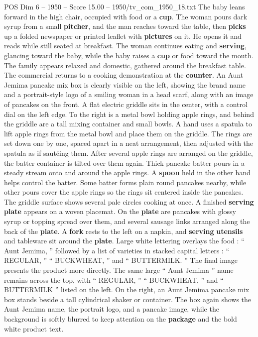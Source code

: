 \begin{textsample}{POS Dim 6 – 1950 – Score 15.00 – 1950/tv\_com\_1950\_18.txt}
The baby leans forward in the high chair, occupied with food or a \textbf{cup}.
The woman pours dark syrup from a small \textbf{pitcher}, and the man reaches toward the table, then \textbf{picks} up a folded newspaper or printed leaflet with \textbf{pictures} on it.
He opens it and reads while still seated at breakfast.
The woman continues eating and \textbf{serving}, glancing toward the baby, while the baby raises a \textbf{cup} or food toward the mouth.
The family appears relaxed and domestic, gathered around the breakfast table.
The commercial returns to a cooking demonstration at the \textbf{counter}.
An Aunt Jemima pancake mix box is clearly visible on the left, showing the brand name and a portrait-style logo of a smiling woman in a head scarf, along with an image of pancakes on the front.
A flat electric griddle sits in the center, with a control dial on the left edge.
To the right is a metal bowl holding apple rings, and behind the griddle are a tall mixing container and small bowls.
A hand uses a spatula to lift apple rings from the metal bowl and place them on the griddle.
The rings are set down one by one, spaced apart in a neat arrangement, then adjusted with the spatula as if sautéing them.
After several apple rings are arranged on the griddle, the batter container is tilted over them again.
Thick pancake batter pours in a steady stream onto and around the apple rings.
A \textbf{spoon} held in the other hand helps control the batter.
Some batter forms plain round pancakes nearby, while other pours cover the apple rings so the rings sit centered inside the pancakes.
The griddle surface shows several pale circles cooking at once.
A finished \textbf{serving} \textbf{plate} appears on a woven placemat.
On the \textbf{plate} are pancakes with glossy syrup or topping spread over them, and several sausage links arranged along the back of the \textbf{plate}.
A \textbf{fork} rests to the left on a napkin, and \textbf{serving} \textbf{utensils} and tableware sit around the \textbf{plate}.
Large white lettering overlays the food : “ Aunt Jemima, ” followed by a list of varieties in stacked capital letters : “ REGULAR, ” “ BUCKWHEAT, ” and “ BUTTERMILK. ” The final image presents the product more directly.
The same large “ Aunt Jemima ” name remains across the top, with “ REGULAR, ” “ BUCKWHEAT, ” and “ BUTTERMILK ” listed on the left.
On the right, an Aunt Jemima pancake mix box stands beside a tall cylindrical shaker or container.
The box again shows the Aunt Jemima name, the portrait logo, and a pancake image, while the background is softly blurred to keep attention on the \textbf{package} and the bold white product text.

\end{textsample}
